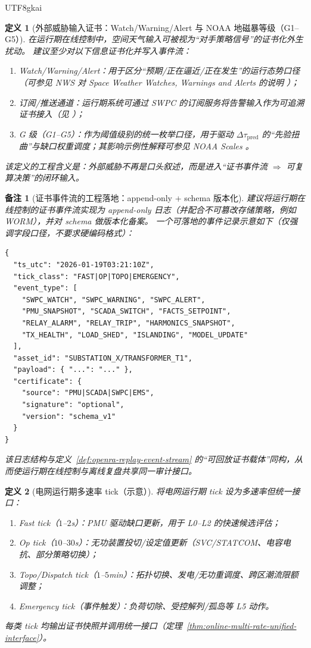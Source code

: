 \documentclass[12pt]{article}
\newtheorem{definition}{定义}[section]
\newtheorem{remark}{备注}[section]
\begin{document}
\begin{CJK*}{UTF8}{gkai}
\begin{definition}[外部威胁输入证书：Watch/Warning/Alert 与 NOAA 地磁暴等级（G1--G5）]
\label{def:online-grid-threat-certificates}
在运行期在线控制中，空间天气输入可被视为“对手策略信号”的证书化外生扰动。
建议至少对以下信息证书化并写入事件流：
\begin{enumerate}
  \item \textsf{Watch/Warning/Alert}：用于区分“预期/正在逼近/正在发生”的运行态势口径（可参见 NWS 对 Space Weather Watches, Warnings and Alerts 的说明
    \cite{ref_nws_space_ww}）；
  \item \textsf{订阅/推送通道}：运行期系统可通过 SWPC 的订阅服务将告警输入作为可追溯证书接入（见 \cite{ref_swpc_subscription_services}）；
  \item \textsf{G 级（G1--G5）}：作为阈值级别的统一枚举口径，用于驱动 $\Delta\tau_{\mathrm{pred}}$ 的“先验扭曲”与缺口权重调度；其影响示例性解释可参见 NOAA Scales
    \cite{ref_swpc_noaa_scales_explanation}。
\end{enumerate}
该定义的工程含义是：外部威胁不再是口头叙述，而是进入“证书事件流 $\Rightarrow$ 可复算决策”的闭环输入。
\end{definition}

\begin{remark}[证书事件流的工程落地：append-only + schema 版本化]
建议将运行期在线控制的证书事件流实现为 append-only 日志（并配合不可篡改存储策略，例如 WORM），并对 schema 做版本化备案。
一个可落地的事件记录示意如下（仅强调字段口径，不要求硬编码格式）：
\begin{verbatim}
{
  "ts_utc": "2026-01-19T03:21:10Z",
  "tick_class": "FAST|OP|TOPO|EMERGENCY",
  "event_type": [
    "SWPC_WATCH", "SWPC_WARNING", "SWPC_ALERT",
    "PMU_SNAPSHOT", "SCADA_SWITCH", "FACTS_SETPOINT",
    "RELAY_ALARM", "RELAY_TRIP", "HARMONICS_SNAPSHOT",
    "TX_HEALTH", "LOAD_SHED", "ISLANDING", "MODEL_UPDATE"
  ],
  "asset_id": "SUBSTATION_X/TRANSFORMER_T1",
  "payload": { "...": "..." },
  "certificate": {
    "source": "PMU|SCADA|SWPC|EMS",
    "signature": "optional",
    "version": "schema_v1"
  }
}
\end{verbatim}
该日志结构与定义~\ref{def:openra-replay-event-stream} 的“可回放证书载体”同构，从而使运行期在线控制与离线复盘共享同一审计接口。
\end{remark}

\begin{definition}[电网运行期多速率 tick（示意）]
\label{def:online-grid-ticks}
将电网运行期 tick 设为多速率但统一接口：
\begin{enumerate}
  \item Fast tick（$1$--$2$s）：PMU 驱动缺口更新，用于 L0--L2 的快速候选评估；
  \item Op tick（$10$--$30$s）：无功装置投切/设定值更新（SVC/STATCOM、电容电抗、部分策略切换）；
  \item Topo/Dispatch tick（$1$--$5$min）：拓扑切换、发电/无功重调度、跨区潮流限额调整；
  \item Emergency tick（事件触发）：负荷切除、受控解列/孤岛等 L5 动作。
\end{enumerate}
每类 tick 均输出证书快照并调用统一接口（定理~\ref{thm:online-multi-rate-unified-interface}）。
\end{definition}


\end{CJK*}
\end{document}

